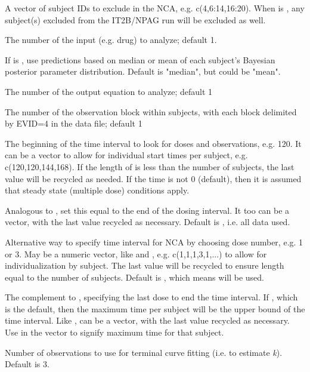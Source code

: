 \documentclass[a4paper]{book}
\begin{document}
\begin{Arguments}
\begin{ldescription}
\item[\code{exclude}] A vector of subject IDs to exclude in the NCA, e.g. c(4,6:14,16:20). When  is , any subject(s) excluded from the IT2B/NPAG run will be excluded as well.

\item[\code{input}] The number of the input (e.g. drug) to analyze; default 1.

\item[\code{icen}] If  is , use predictions based on median or mean of each
subject's Bayesian posterior parameter distribution.  Default is "median", but could be "mean".

\item[\code{outeq}] The number of the output equation to analyze; default 1

\item[\code{block}] The number of the observation block within subjects, with each block delimited by EVID=4 in the data file; default 1

\item[\code{start}] The beginning of the time interval to look for doses and observations, e.g. 120.  It can be
a vector to allow for individual start times per subject, e.g. c(120,120,144,168).  If the length of 
is less than the number of subjects, the last value will be recycled as needed.  If the  time is not 0 (default), 
then it is assumed that steady state (multiple dose) conditions apply.

\item[\code{end}] Analogous to , set this equal to the end of the dosing interval. It too can be a vector, with the last value
recycled as necessary.  Default is , i.e. all data used.

\item[\code{first}] Alternative way to specify time interval for NCA by choosing dose number, e.g. 1 or 3.  May be a numeric vector, like  and ,
e.g. c(1,1,1,3,1,...) to allow for individualization by subject.  The last value will be recycled to ensure length equal to the
number of subjects.  Default is , which means  will be used.

\item[\code{last}] The complement to , specifying the last dose to end the time interval.  If ,
which is the default, then the maximum time per subject will be the upper bound of the time interval.
Like ,  can be a vector, with the last value recycled as necessary.  Use  in the vector
to signify maximum time for that subject.

\item[\code{terminal}] Number of observations to use for terminal curve fitting (i.e. to estimate \emph{k}).  Default is 3.
\end{ldescription}
\end{Arguments}
\end{document}
